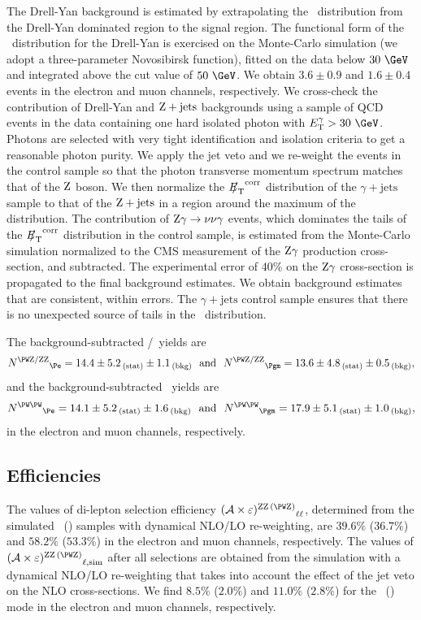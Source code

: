 The Drell-Yan background is estimated by extrapolating the \CORRMET\ distribution from the Drell-Yan dominated region to the signal region. The functional form of the \CORRMET\ distribution for the Drell-Yan is exercised on the Monte-Carlo simulation (we adopt a three-parameter Novosibirsk function), fitted on the data below $30~\GeV$ and integrated above the cut value of $50~\GeV$. We obtain $3.6\pm0.9$  and $1.6\pm0.4$ events in the electron and muon channels, respectively. We cross-check the contribution of Drell-Yan and $\mathrm{Z} + {\mathrm {jets}}$ backgrounds using a sample of QCD events in the data containing one hard isolated photon with $\ET^{\gamma}>30~\GeV$.  Photons are selected with very tight identification and isolation criteria to get a reasonable photon purity. We apply the jet veto and we re-weight the events in the control sample so that the photon transverse momentum spectrum matches that of the $\mathrm{Z}$ boson. We then normalize the ${{E\!\!\!/}_{\mathrm{T}}}^{\mathrm{corr}}$ distribution of the $\gamma+\mathrm{jets}$ sample to that of the $\mathrm{Z} + {\mathrm {jets}}$ in a region around the maximum of the distribution. The contribution of $\mathrm{Z}\gamma \to \nu\nu\gamma$ events, which dominates the tails of the ${{E\!\!\!/}_{\mathrm{T}}}^{\mathrm{corr}}$ distribution in the control sample, is estimated from the Monte-Carlo simulation normalized to the CMS measurement of the $\mathrm{Z}\gamma$ production cross-section, and subtracted. The experimental error of $40\%$ on the $\mathrm{Z}\gamma$ cross-section is propagated to the final background estimates. 
We obtain background estimates that are consistent, within errors. The $\gamma+\mathrm{jets}$ control sample ensures that there is no unexpected source of tails in the \CORRMET\ distribution. 

The background-subtracted \WZ/\ZZ\ yields are $${N^{\WZ/\ZZ}}_{\Pe}=\NElePeakingWithWZ\ \ \mathrm{and}\ \ {N^{\WZ/\ZZ}}_{\Pgm}=\NMuoPeakingWithWZ,$$
and the background-subtracted \WW\ yields are $${N^{\WW}}_{\Pe} = \NEleNonPeaking\ \ \mathrm{and}\ \ {N^{\WW}}_{\Pgm}=\NMuoNonPeaking,$$ in the electron and muon channels, respectively.


\subsection{Efficiencies}

The values of di-lepton selection efficiency ${(\mathcal{A}\times\varepsilon)^{\ZZ\,(\WZ)}}_{\ell\ell}$, determined from the simulated \ZZ\ (\WZ) samples with dynamical NLO/LO re-weighting, are  $39.6\%$ ($36.7\%$) and $58.2\%$ ($53.3\%$) in the electron and muon channels, respectively. The values of ${(\mathcal{A}\times\varepsilon)^{\ZZ\,(\WZ)}}_{\ell,\mathrm{sim}}$ after all selections are obtained from the simulation with a dynamical NLO/LO re-weighting that takes into account the effect of the jet veto on the NLO cross-sections. We find $8.5\%$ ($2.0\%$) and $11.0\%$ ($2.8\%$) for the \ZZ\ (\WZ) mode in the electron and muon channels, respectively. 

